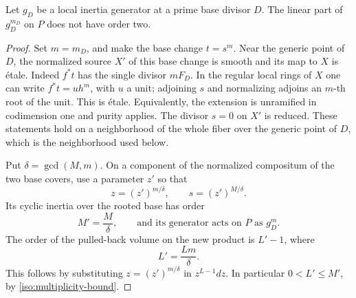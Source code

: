 \begin{lemma}\label{iso:order-two}
Let \(g_D\) be a local inertia generator at a prime base divisor \(D\).
The linear part of \(g_D^{m_D}\) on \(P\) does not have order two.
\end{lemma}

\begin{proof}
Set \(m=m_D\), and make the base change \(t=s^m\).
Near the generic point of \(D\), the normalized source \(X'\) of this
base change is smooth and its map to \(X\) is \'{e}tale.
Indeed \(f^*t\) has the single divisor \(mF_D\).
In the regular local rings of \(X\) one can write
\(f^*t=u h^m\), with \(u\) a unit; adjoining \(s\) and normalizing
adjoins an \(m\)-th root of the unit.  This is \'{e}tale.
Equivalently, the extension is unramified in codimension one and
purity applies.  The divisor \(s=0\) on \(X'\) is reduced.
These statements hold on a neighborhood of the whole fiber over
the generic point of \(D\), which is the neighborhood used below.

Put \(\delta=\gcd(M,m)\).
On a component of the normalized compositum of the two base covers,
use a parameter \(z'\) so that
\[
 z=(z')^{m/\delta},\qquad
 s=(z')^{M/\delta}.
\]
Its cyclic inertia over the rooted base has order
\[
             M'=\frac M\delta,
 \qquad\text{and its generator acts on \(P\) as }g_D^m.
\]
The order of the pulled-back volume on the new product is \(L'-1\),
where
\begin{equation}\label{iso:rooted-indices}
                         L'=\frac{Lm}{\delta}.
\end{equation}
This follows by substituting \(z=(z')^{m/\delta}\) in
\(z^{L-1}dz\).  In particular
\(0<L'\le M'\), by \eqref{iso:multiplicity-bound}.


\end{proof}
